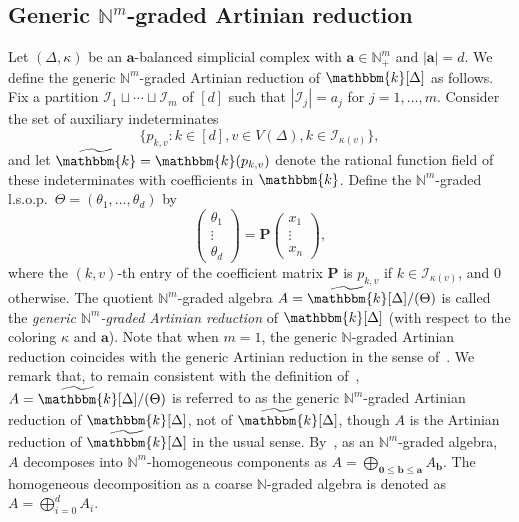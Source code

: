 \subsection{Generic \texorpdfstring{$\mathbb{N}^m$}{N\^{}m}-graded Artinian reduction}
Let $(\Delta,\kappa)$ be an $\bm{a}$-balanced simplicial complex with $\bm{a} \in \mathbb{N}^m_+$ and $|\bm{a}|=d$. We define the generic $\mathbb{N}^m$-graded Artinian reduction of $\mathbbm{k}[\Delta]$ as follows.
Fix a partition $\mathcal{I}_1 \sqcup \cdots \sqcup \mathcal{I}_m$ of $[d]$ such that $|\mathcal{I}_j|=a_j$ for $j=1,\ldots,m$.
Consider the set of auxiliary indeterminates
\begin{equation*}
\{p_{k,v}: k \in [d], v \in V(\Delta), k \in \mathcal{I}_{\kappa(v)}\},
\end{equation*}
and let $\widetilde{\mathbbm{k}}=\mathbbm{k}(p_{k,v})$ denote the rational function field of these indeterminates with coefficients in $\mathbbm{k}$. 
Define the $\mathbb{N}^m$-graded l.s.o.p.~$\Theta=(\theta_1,\ldots,\theta_d)$ by 
\[
\begin{pmatrix}
\theta_1 \\
\vdots \\
\theta_d
\end{pmatrix}
=
\bm{P}
\begin{pmatrix}
x_1 \\
\vdots \\
x_n
\end{pmatrix},
\]
where the $(k,v)$-th entry of the coefficient matrix $\bm{P}$ is $p_{k,v}$ if $k \in \mathcal{I}_{\kappa(v)}$, and $0$ otherwise.
The quotient $\mathbb{N}^m$-graded algebra $A=\widetilde{\mathbbm{k}}[\Delta]/(\Theta)$ is called the \emph{generic $\mathbb{N}^m$-graded Artinian reduction} of $\mathbbm{k}[\Delta]$ (with respect to the coloring $\kappa$ and $\bm{a}$).
Note that when $m=1$, the generic $\mathbb{N}$-graded Artinian reduction coincides with the generic Artinian reduction in the sense of~\cite{PP}. We remark that, to remain consistent with the definition of~\cite{PP}, $A=\widetilde{\mathbbm{k}}[\Delta]/(\Theta)$ is referred to as the generic $\mathbb{N}^m$-graded Artinian reduction of $\mathbbm{k}[\Delta]$, not of $\widetilde{\mathbbm{k}}[\Delta]$, though $A$ is the Artinian reduction of $\widetilde{\mathbbm{k}}[\Delta]$ in the usual sense.
By~\cite[Theorem 4.1]{Sta79}, as an $\mathbb{N}^m$-graded algebra, $A$ decomposes into $\mathbb{N}^m$-homogeneous components as $A=\bigoplus_{\bm{0} \leq \bm{b} \leq \bm{a}} A_{\bm{b}}$.
The homogeneous decomposition as a coarse $\mathbb{N}$-graded algebra is denoted as $A=\bigoplus_{i=0}^d A_i$.

